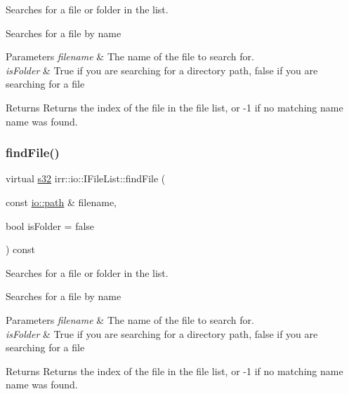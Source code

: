 Searches for a file or folder in the list. 

Searches for a file by name 
\begin{DoxyParams}{Parameters}
{\em filename} & The name of the file to search for. \\
\hline
{\em is\+Folder} & True if you are searching for a directory path, false if you are searching for a file \\
\hline
\end{DoxyParams}
\begin{DoxyReturn}{Returns}
Returns the index of the file in the file list, or -\/1 if no matching name name was found. 
\end{DoxyReturn}
\mbox{\label{classirr_1_1io_1_1IFileList_a2b0fce45cbea72f5c6dc13eb85183054}} 
\subsubsection{\texorpdfstring{find\+File()}{findFile()}\hspace{0.1cm}{\footnotesize\ttfamily [2/2]}}
{\footnotesize\ttfamily virtual \hyperlink{namespaceirr_ac66849b7a6ed16e30ebede579f9b47c6}{s32} irr\+::io\+::\+I\+File\+List\+::find\+File (\begin{DoxyParamCaption}\item[{const \hyperlink{namespaceirr_1_1io_a6468281622ce3a1c46b72e19f32dded5}{io\+::path} \&}]{filename,  }\item[{bool}]{is\+Folder = {\ttfamily false} }\end{DoxyParamCaption}) const\hspace{0.3cm}{\ttfamily [pure virtual]}}



Searches for a file or folder in the list. 

Searches for a file by name 
\begin{DoxyParams}{Parameters}
{\em filename} & The name of the file to search for. \\
\hline
{\em is\+Folder} & True if you are searching for a directory path, false if you are searching for a file \\
\hline
\end{DoxyParams}
\begin{DoxyReturn}{Returns}
Returns the index of the file in the file list, or -\/1 if no matching name name was found. 
\end{DoxyReturn}
\mbox{\label{classirr_1_1io_1_1IFileList_a871861be76e18d58274c4580b1d103b9}} 
